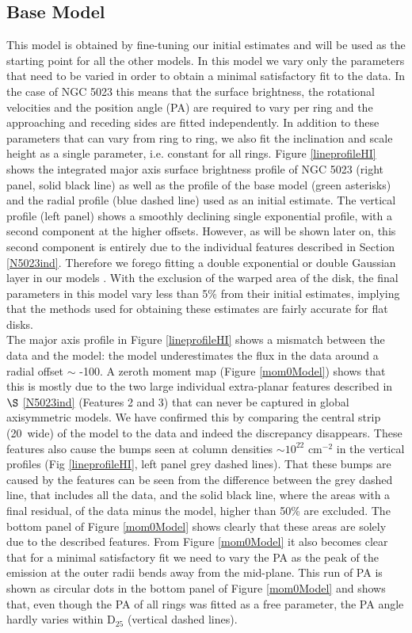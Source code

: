 \documentclass[useAMS,usenatbib]{mn2e}
\begin{document}
\subsection{Base Model}
This model is obtained by fine-tuning our initial estimates and will be used as the starting point for all the other models. In this model  we vary only the parameters that need to be varied in order to obtain a minimal satisfactory fit to the data.  In the case of NGC 5023 this means that the surface brightness, the rotational velocities  and the position angle (PA) are required to vary per ring and the approaching and receding sides are fitted independently.  In addition to these parameters that can vary from ring to ring, we also fit the inclination and scale height as a single parameter, i.e. constant for all rings. Figure \ref{lineprofileHI} shows the integrated major axis surface brightness profile of NGC 5023 (right panel, solid black line) as well as the profile of the base model (green asterisks) and the {\sc radial} profile (blue dashed line) used as an initial estimate. The vertical profile (left panel) shows a smoothly declining single exponential profile, with a second component at the higher offsets. However, as will be shown later on, this second component is entirely due to the individual features described in Section \ref{N5023ind}. Therefore we forego fitting a double exponential or double Gaussian layer in our models \citep[see also][]{Zschaechner2011}. With the exclusion of the warped area of the disk, the final parameters in this model vary less than 5\% from their initial estimates, implying that the methods used for obtaining these estimates are fairly accurate for flat disks. \\
\indent The major axis profile in Figure \ref{lineprofileHI} shows a mismatch between the data and the model: the model underestimates the flux in the data around a radial offset $\sim$ -100\arcsec. A zeroth moment map  (Figure \ref{mom0Model})  shows that this is mostly due to the two large individual extra-planar features described in $\S$ \ref{N5023ind} (Features 2 and 3) that can never be captured in global axisymmetric models.  We have confirmed this by comparing the central strip (20\arcsec\ wide) of the model to the data and indeed the discrepancy disappears. These features also cause the bumps seen at column densities $\sim10^{22}$ cm$^{-2}$ in the vertical profiles (Fig \ref{lineprofileHI}, left panel grey dashed lines).  That these bumps are caused by the features can be seen from the difference between the grey dashed line, that includes all the data, and the solid black line, where the areas with a final residual, of the data minus the model, higher than 50\% are excluded. The bottom panel of Figure \ref{mom0Model} shows clearly that these areas are solely due to the described features. From Figure \ref{mom0Model} it also becomes clear that for a minimal satisfactory fit we need to vary the PA as the peak of the emission at the outer radii bends away from the mid-plane. This run of  PA is shown as circular dots in the bottom panel of Figure \ref{mom0Model} and shows that, even though the PA of all rings was fitted as a free parameter, the PA angle hardly varies within D$_{25}$ (vertical dashed lines). \\
\end{document}
